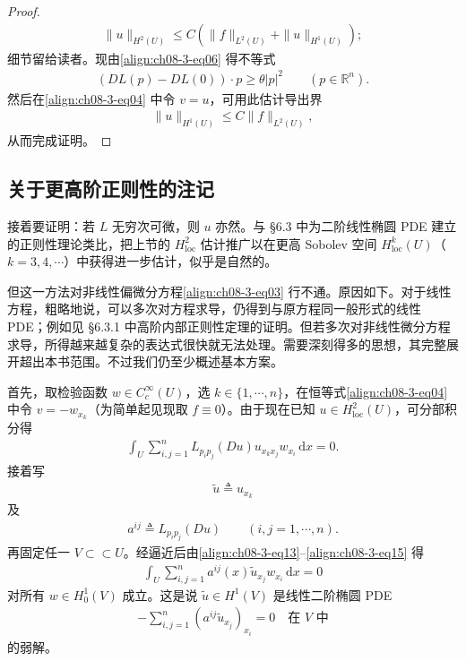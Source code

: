 \documentclass[../../main.tex]{subfiles}
\begin{document}
\begin{theorem}[极小元的二阶导数]
\begin{proof}
\begin{align*}
\|u\|_{H^2(U)}\leqslant C(\|f\|_{L^2(U)}+\|u\|_{H^1(U)});
\end{align*}
细节留给读者。现由\eqref{align:ch08-3-eq06} 得不等式
\begin{align*}
(DL(p)-DL(0))\cdot p\geqslant\theta|p|^2\qquad (p\in\mathbb{R}^n).
\end{align*}
然后在\eqref{align:ch08-3-eq04} 中令 $v=u$，可用此估计导出界
\begin{align*}
\|u\|_{H^1(U)}\leqslant C\|f\|_{L^2(U)},
\end{align*}
从而完成证明。
\end{proof}
\end{theorem}

\subsection{关于更高阶正则性的注记}\label{subsection:ch08-3-2-高阶正则性}

接着要证明：若 $L$ 无穷次可微，则 $u$ 亦然。与 \S6.3 中为二阶线性椭圆 PDE 建立的正则性理论类比，把上节的 $H^2_{\mathrm{loc}}$ 估计推广以在更高 Sobolev 空间 $H^k_{\mathrm{loc}}(U)$（$k=3,4,\cdots$）中获得进一步估计，似乎是自然的。

但这一方法对非线性偏微分方程\eqref{align:ch08-3-eq03} 行不通。原因如下。对于线性方程，粗略地说，可以多次对方程求导，仍得到与原方程同一般形式的线性 PDE；例如见 \S6.3.1 中高阶内部正则性定理的证明。但若多次对非线性微分方程求导，所得越来越复杂的表达式很快就无法处理。需要深刻得多的思想，其完整展开超出本书范围。不过我们仍至少概述基本方案。

首先，取检验函数 $w\in C_c^\infty(U)$，选 $k\in\{1,\cdots,n\}$，在恒等式\eqref{align:ch08-3-eq04} 中令 $v=-w_{x_k}$（为简单起见现取 $f\equiv 0$）。由于现在已知 $u\in H^2_{\mathrm{loc}}(U)$，可分部积分得
\begin{align}
\int_U\sum_{i,j=1}^n L_{p_ip_j}(Du)u_{x_kx_j}w_{x_i}\,\mathrm{d}x=0.\label{align:ch08-3-eq13}
\end{align}
接着写
\begin{align}
\widetilde{u}\triangleq u_{x_k}\label{align:ch08-3-eq14}
\end{align}
及
\begin{align}
a^{ij}\triangleq L_{p_ip_j}(Du)\qquad (i,j=1,\cdots,n).\label{align:ch08-3-eq15}
\end{align}
再固定任一 $V\subset \subset U$。经逼近后由\eqref{align:ch08-3-eq13}--\eqref{align:ch08-3-eq15} 得
\begin{align}
\int_U\sum_{i,j=1}^n a^{ij}(x)\widetilde{u}_{x_j}w_{x_i}\,\mathrm{d}x=0\label{align:ch08-3-eq16}
\end{align}
对所有 $w\in H_0^1(V)$ 成立。这是说 $\widetilde{u}\in H^1(V)$ 是线性二阶椭圆 PDE
\begin{align}
-\sum_{i,j=1}^n(a^{ij}\widetilde{u}_{x_j})_{x_i}=0\quad\text{在 }V\text{ 中}\label{align:ch08-3-eq17}
\end{align}
的弱解。
\end{document}
